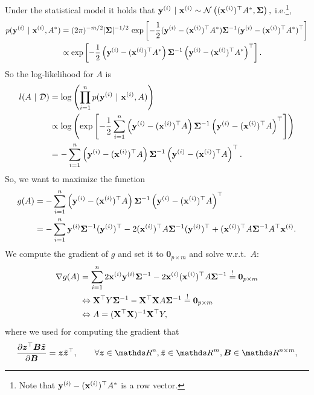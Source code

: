 \documentclass[a4paper]{article}
\begin{document}
{\begin{enumerate}
	Under the statistical model it holds that $\mathbf{y}^{(i)}~|~\mathbf{x}^{(i)} \sim \mathcal{N}\left(	(\mathbf{x}^{(i)})^\top A^*, \bm{\Sigma}	\right),$ i.e.\footnote{Note that $\mathbf{y}^{(i)} - (\mathbf{x}^{(i)})^\top A^* $ is a row vector.},
	\begin{align}\label{def_distr}
		p(\mathbf{y}^{(i)}~|~\mathbf{x}^{(i)},A^*) 
		&= (2\pi)^{-m/2} |\bm{\Sigma}|^{-1/2} \, \exp\left[	-\frac12 (\mathbf{y}^{(i)} - (\mathbf{x}^{(i)})^\top A^* )	\bm{\Sigma}^{-1} (\mathbf{y}^{(i)} - (\mathbf{x}^{(i)})^\top A^* )^\top	\right] \notag \\
		&\propto \exp\left[	-\frac12 \left(\mathbf{y}^{(i)} - (\mathbf{x}^{(i)})^\top A^* \right)	\bm{\Sigma}^{-1} \left(\mathbf{y}^{(i)} - (\mathbf{x}^{(i)})^\top A^* \right)^\top	\right] .
	\end{align}
	So the log-likelihood for $A$ is
	\begin{align*}
		l(A~|~\mathcal{D}) 
		&= \log\left(	\prod_{i=1}^n 		p(\mathbf{y}^{(i)}~|~\mathbf{x}^{(i)},A)	\right) \\
		&\propto \log\left(	 	\exp\left[	-\frac12 \sum_{i=1}^n \left(\mathbf{y}^{(i)} - (\mathbf{x}^{(i)})^\top A \right)	\bm{\Sigma}^{-1} \left(\mathbf{y}^{(i)} - (\mathbf{x}^{(i)})^\top A \right)^\top	\right]	\right) \\
		&= 	-\sum_{i=1}^n  \left(\mathbf{y}^{(i)} - (\mathbf{x}^{(i)})^\top A \right)	\bm{\Sigma}^{-1} \left(\mathbf{y}^{(i)} - (\mathbf{x}^{(i)})^\top A \right)^\top.		 
	\end{align*}
	So, we want to maximize the function 
	\begin{align*}
		g(A) 
		&= 	-\sum_{i=1}^n  \left(\mathbf{y}^{(i)} - (\mathbf{x}^{(i)})^\top A \right)	\bm{\Sigma}^{-1} \left(\mathbf{y}^{(i)} - (\mathbf{x}^{(i)})^\top A \right)^\top \\
		&= 	-\sum_{i=1}^n  \mathbf{y}^{(i)} \bm{\Sigma}^{-1} (\mathbf{y}^{(i)})^\top  
		- 2 (\mathbf{x}^{(i)})^\top A \bm{\Sigma}^{-1} (\mathbf{y}^{(i)})^\top 
		+ (\mathbf{x}^{(i)})^\top A	\bm{\Sigma}^{-1}  A^\top \mathbf{x}^{(i)}.	
	\end{align*}
	We compute the gradient of $g$ and set it to $\bm{0}_{p\times m}$ and solve w.r.t.\ $A:$
	\begin{align*}
		\nabla g(A) 
		&= 	\sum_{i=1}^n   2 \mathbf{x}^{(i)} \mathbf{y}^{(i)}   \bm{\Sigma}^{-1}
		- 2   \mathbf{x}^{(i)}	(\mathbf{x}^{(i)})^\top  A \bm{\Sigma}^{-1}   \stackrel{!}{=} \bm{0}_{p\times m} \\
		&\Leftrightarrow 	\mathbf{X}^\top Y  \bm{\Sigma}^{-1}
		-   \mathbf{X}^\top \mathbf{X}  A \bm{\Sigma}^{-1}   \stackrel{!}{=} \bm{0}_{p\times m} \\
		&\Leftrightarrow A = (\mathbf{X}^\top \mathbf{X})^{-1} \mathbf{X}^\top Y,	
	\end{align*}
	where we used for computing the gradient that 
	\begin{align*}
		&\frac{\partial \bm{z}^\top \bm{B} \tilde{\bm{z}} }{\partial  \bm{B} } = \bm{z} \tilde{\bm{z}}^\top, \qquad \forall \bm{z}\in\R^n,\tilde{\bm{z}}\in \R^{m}, \bm{B}\in\R^{n \times m}, \\

\end{align*}
\end{enumerate}}
\end{document}
